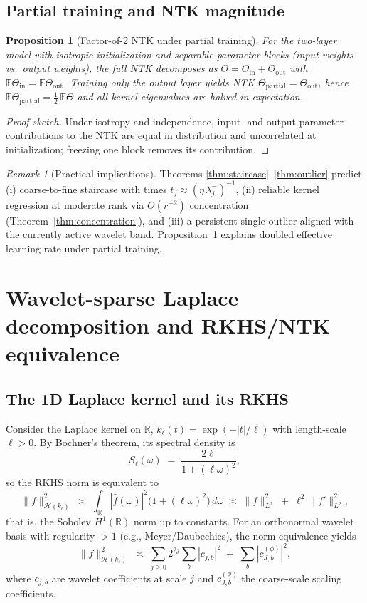 \documentclass[11pt]{article}
\newtheorem{proposition}{Proposition}
\theoremstyle{remark}
\newtheorem{remark}{Remark}
\begin{document}
\subsection{Partial training and NTK magnitude}

\begin{proposition}[Factor-of-2 NTK under partial training]\label{prop:half}
For the two-layer model with isotropic initialization and separable parameter blocks (input weights vs.\ output weights), the full NTK decomposes as $\Theta = \Theta_{\mathrm{in}} + \Theta_{\mathrm{out}}$ with $\mathbb{E}\Theta_{\mathrm{in}} = \mathbb{E}\Theta_{\mathrm{out}}$. Training only the output layer yields NTK $\Theta_{\mathrm{partial}} = \Theta_{\mathrm{out}}$, hence $\mathbb{E}\Theta_{\mathrm{partial}} = \tfrac{1}{2}\,\mathbb{E}\Theta$ and all kernel eigenvalues are halved in expectation.
\end{proposition}

\begin{proof}[Proof sketch]
Under isotropy and independence, input- and output-parameter contributions to the NTK are equal in distribution and uncorrelated at initialization; freezing one block removes its contribution.
\end{proof}

\begin{remark}[Practical implications]
Theorems \ref{thm:staircase}--\ref{thm:outlier} predict (i) coarse-to-fine staircase with times $t_j \approx (\eta\,\lambda_j^{-})^{-1}$, (ii) reliable kernel regression at moderate rank via $O(r^{-2})$ concentration (Theorem~\ref{thm:concentration}), and (iii) a persistent single outlier aligned with the currently active wavelet band. Proposition~\ref{prop:half} explains doubled effective learning rate under partial training.
\end{remark}

\section{Wavelet-sparse Laplace decomposition and RKHS/NTK equivalence}\label{sec:laplace-wavelet}

\subsection{The 1D Laplace kernel and its RKHS}
Consider the Laplace kernel on $\mathbb{R}$, $k_\ell(t) = \exp(-|t|/\ell)$ with length-scale $\ell>0$. By Bochner's theorem, its spectral density is
\[
S_\ell(\omega) \;=\; \frac{2\ell}{1 + (\ell \omega)^2},
\]
so the RKHS norm is equivalent to
\[
\|f\|_{\mathcal{H}(k_\ell)}^2 \;\asymp\; \int_{\mathbb{R}} | \widehat f(\omega)|^2 \big(1 + (\ell \omega)^2\big)\, d\omega \;\asymp\; \|f\|_{L^2}^2 \;+\; \ell^2 \|f'\|_{L^2}^2,
\]
that is, the Sobolev $H^1(\mathbb{R})$ norm up to constants. For an orthonormal wavelet basis with regularity $>1$ (e.g., Meyer/Daubechies), the norm equivalence yields
\[
\|f\|_{\mathcal{H}(k_\ell)}^2 \;\asymp\; \sum_{j\ge 0} 2^{2j} \sum_{b} |c_{j,b}|^2 \;+\; \sum_b |c^{(\phi)}_{J,b}|^2,
\]
where $c_{j,b}$ are wavelet coefficients at scale $j$ and $c^{(\phi)}_{J,b}$ the coarse-scale scaling coefficients.
\end{document}
